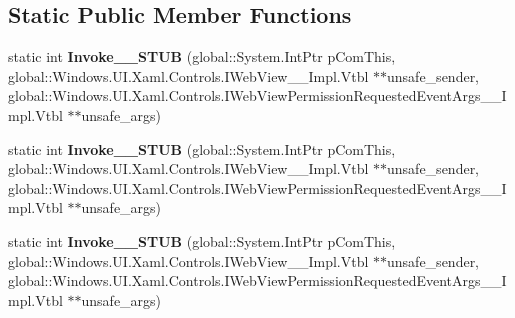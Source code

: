\subsection*{Static Public Member Functions}
\begin{DoxyCompactItemize}
\item 
\mbox{\label{struct_windows_1_1_foundation_1_1_typed_event_handler___a___windows___u_i___xaml___controls___we02730dfc82c56beef290621040cade95_a647a89ab3e74a2c84cefc4b606a57a60}} 
static int {\bfseries Invoke\+\_\+\+\_\+\+S\+T\+UB} (global\+::\+System.\+Int\+Ptr p\+Com\+This, global\+::\+Windows.\+U\+I.\+Xaml.\+Controls.\+I\+Web\+View\+\_\+\+\_\+\+Impl.\+Vtbl $\ast$$\ast$unsafe\+\_\+sender, global\+::\+Windows.\+U\+I.\+Xaml.\+Controls.\+I\+Web\+View\+Permission\+Requested\+Event\+Args\+\_\+\+\_\+\+Impl.\+Vtbl $\ast$$\ast$unsafe\+\_\+args)
\item 
\mbox{\label{struct_windows_1_1_foundation_1_1_typed_event_handler___a___windows___u_i___xaml___controls___we02730dfc82c56beef290621040cade95_a647a89ab3e74a2c84cefc4b606a57a60}} 
static int {\bfseries Invoke\+\_\+\+\_\+\+S\+T\+UB} (global\+::\+System.\+Int\+Ptr p\+Com\+This, global\+::\+Windows.\+U\+I.\+Xaml.\+Controls.\+I\+Web\+View\+\_\+\+\_\+\+Impl.\+Vtbl $\ast$$\ast$unsafe\+\_\+sender, global\+::\+Windows.\+U\+I.\+Xaml.\+Controls.\+I\+Web\+View\+Permission\+Requested\+Event\+Args\+\_\+\+\_\+\+Impl.\+Vtbl $\ast$$\ast$unsafe\+\_\+args)
\item 
\mbox{\label{struct_windows_1_1_foundation_1_1_typed_event_handler___a___windows___u_i___xaml___controls___we02730dfc82c56beef290621040cade95_a647a89ab3e74a2c84cefc4b606a57a60}} 
static int {\bfseries Invoke\+\_\+\+\_\+\+S\+T\+UB} (global\+::\+System.\+Int\+Ptr p\+Com\+This, global\+::\+Windows.\+U\+I.\+Xaml.\+Controls.\+I\+Web\+View\+\_\+\+\_\+\+Impl.\+Vtbl $\ast$$\ast$unsafe\+\_\+sender, global\+::\+Windows.\+U\+I.\+Xaml.\+Controls.\+I\+Web\+View\+Permission\+Requested\+Event\+Args\+\_\+\+\_\+\+Impl.\+Vtbl $\ast$$\ast$unsafe\+\_\+args)
\item 

\end{DoxyCompactItemize}
